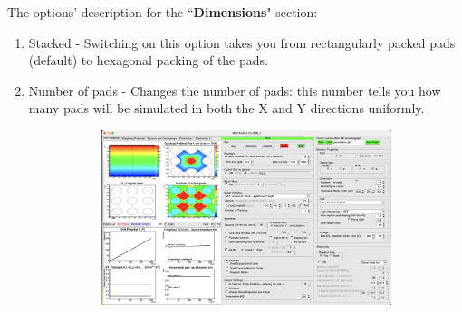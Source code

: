 \documentclass[11pt]{article}
\begin{document}
The options' description for the ``\textbf{Dimensions}" section:
\begin{enumerate}
    \item Stacked - Switching on this option takes you from rectangularly packed pads (default) to hexagonal packing of the pads.
    \item Number of pads - Changes the number of pads: this number tells you how many pads will be simulated in both the X and Y directions uniformly.
    \begin{figure}[h!]
        \centering
        \begin{subfigure}[t]{0.99\textwidth}
            \centering
            \includegraphics[width=5in]{Images/3x3_pad_structure.png}
            \caption{}
            \label{fig:3x3-pad-field}
        \end{subfigure}%


\end{figure}
\end{enumerate}
\end{document}
